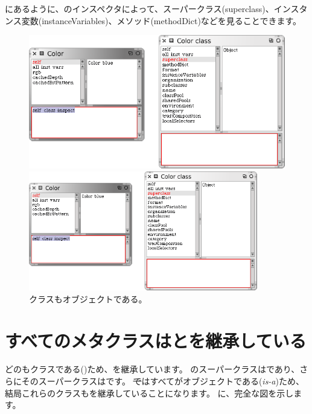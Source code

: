\documentclass[a4paper,10pt,twoside]{book}
\begin{document}
にあるように、のインスペクタによって、スーパークラス(superclass)、インスタンス変数(instanceVariables)、メソッド(methodDict)などを見ることできます。

\begin{center}
\begin{figure}[!ht]
\ifluluelse
	{\centerline{\includegraphics[width=\textwidth]{InspectingColor}}}
	{\centerline{\includegraphics[width=10cm]{InspectingColor}}}
\caption{クラスもオブジェクトである。}
\end{figure}
\end{center}

\section{すべてのメタクラスはとを継承している}

どのもクラスである()ため、を継承しています。
のスーパークラスはであり、さらにそのスーパークラスはです。
\st ではすべてがオブジェクトである(\emph{is-a})ため、結局これらのクラスもを継承していることになります。
に、完全な図を示します。
\end{document}
